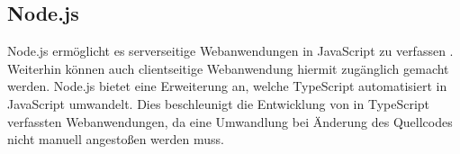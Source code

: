 \subsection{Node.js}
\label{sec:nodejs}

Node.js ermöglicht es serverseitige Webanwendungen in JavaScript zu verfassen \cite[S. 4]{Fedosejev2015}. Weiterhin können auch clientseitige Webanwendung hiermit zugänglich gemacht werden. Node.js bietet eine Erweiterung an, welche TypeScript automatisiert in JavaScript umwandelt. Dies beschleunigt die Entwicklung von in TypeScript verfassten Webanwendungen, da eine Umwandlung bei Änderung des Quellcodes nicht manuell angestoßen werden muss.